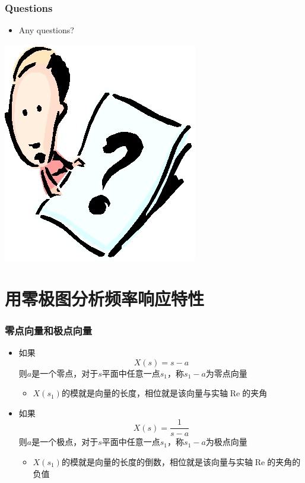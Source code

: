 \documentclass[CJKutf8,dvipsnames,table]{beamer}
\begin{document}
\begin{CJK*}{UTF8}{song}
  \begin{frame}
    \frametitle{Questions}
    \begin{itemize}
    \item Any questions?
    \end{itemize}
    \begin{center}
      \includegraphics[scale=.5]{question}
    \end{center}
  \end{frame}
  
  \section{用零极图分析频率响应特性}
  
  \begin{frame}
    \frametitle{零点向量和极点向量}
    \begin{itemize}
	\item 如果
	\[
	X(s)=s-a
	\]
	则$a$是一个零点，对于$s$平面中任意一点$s_1$，称$s_1-a$为零点向量
		\begin{itemize}
		\item $X(s_1)$的模就是向量的长度，相位就是该向量与实轴$\operatorname{Re}$的夹角
		\end{itemize}
	\item 如果
	\[
	X(s)=\frac{1}{s-a}
	\]
	则$a$是一个极点，对于$s$平面中任意一点$s_1$，称$s_1-a$为极点向量
		\begin{itemize}
		\item $X(s_1)$的模就是向量的长度的倒数，相位就是该向量与实轴$\operatorname{Re}$的夹角的负值
		\end{itemize}


\end{itemize}
\end{frame}
\end{CJK*}
\end{document}
